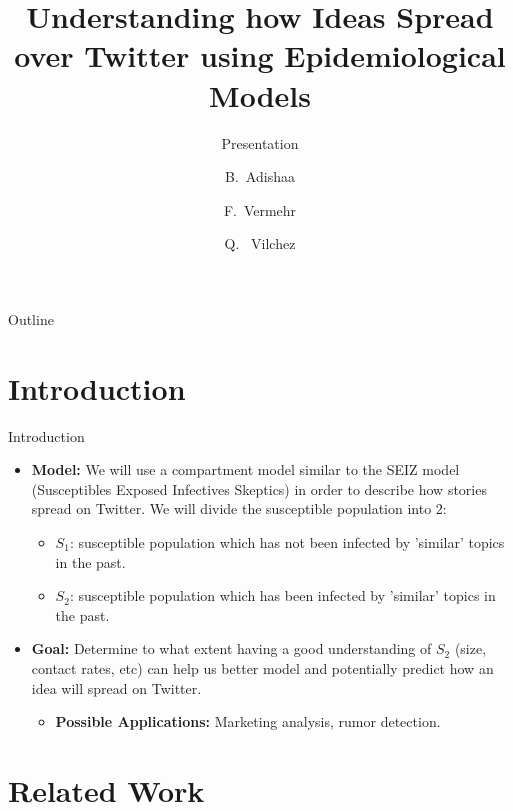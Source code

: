 \documentclass{beamer}
\title{Understanding how Ideas Spread over Twitter using Epidemiological Models}
\subtitle{Presentation}
\author{B.~Adishaa \and F.~Vermehr \and Q. ~Vilchez}
\institute[University of Toronto] %
{
  MAT482 Topics in Mathematics: Math Models\\
  University of Toronto}
\date{}
\begin{document}
\begin{frame}
  \titlepage
\end{frame}

\begin{frame}{Outline}
  \tableofcontents
\end{frame}

\section{Introduction}

\begin{frame}{Introduction}
\begin{itemize}
    \item \textbf{Model:} We will use a compartment model similar to the SEIZ model (Susceptibles Exposed Infectives Skeptics) in order to describe how stories spread on Twitter. We will divide the susceptible population into $2$:{\begin{itemize}
        \item $S_1$: susceptible population which has not been infected by 'similar' topics in the past.
        \item $S_2$: susceptible population which has been infected by 'similar' topics in the past.
    \end{itemize}}
    \item \textbf{Goal:} Determine to what extent having a good understanding of $S_2$ (size, contact rates, etc) can help us better model and potentially predict how an idea will spread on Twitter.
    {\begin{itemize}
        \item \textbf{Possible Applications:} Marketing analysis, rumor detection. 
    \end{itemize}}
\end{itemize}
\end{frame}

\section{Related Work}
\end{document}
